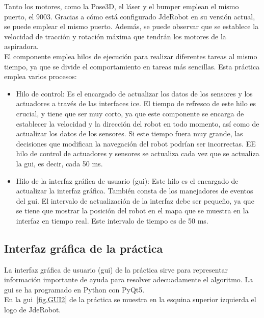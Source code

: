 Tanto los motores, como la Pose3D, el láser y el bumper emplean el mismo puerto, el 9003. Gracias a cómo está configurado JdeRobot en su versión actual, se puede emplear el mismo puerto. Además, se puede observar que se establece la velocidad de tracción y rotación máxima que tendrán los motores de la aspiradora.\\

El componente emplea hilos de ejecución para realizar diferentes tareas al mismo tiempo, ya que se divide el comportamiento en tareas más sencillas. Esta práctica emplea varios procesos:

\begin{itemize}
\item Hilo de control: Es el encargado de actualizar los datos de los sensores y los actuadores a través de las interfaces \acrshort{ice}. El tiempo de refresco de este hilo es crucial, y tiene que ser muy corto, ya que este componente se encarga de establecer la velocidad y la dirección del robot en todo momento, así como de actualizar los datos de los sensores. Si este tiempo fuera muy grande, las decisiones que modifican la navegación del robot podrían ser incorrectas. EE hilo de control de actuadores y sensores se actualiza cada vez que se actualiza la \acrshort{gui}, es decir, cada 50 ms.

\item	Hilo de la interfaz gráfica de usuario (\acrshort{gui}): Este hilo es el encargado de actualizar la interfaz gráfica. También consta de los manejadores de eventos del \acrshort{gui}. El intervalo de actualización de la interfaz debe ser pequeño, ya que se tiene que mostrar la posición del robot en el mapa que se muestra en la interfaz en tiempo real. Este intervalo de tiempo es de 50 ms.

\end{itemize}


\subsection{Interfaz gráfica de la práctica}
La interfaz gráfica de usuario (\acrshort{gui}) de la práctica sirve para representar información importante de ayuda para resolver adecuadamente el algoritmo. La \acrshort{gui} se ha programado en Python con PyQt5.\\

En la \acrshort{gui}~\ref{fig.GUI2} de la práctica se muestra en la esquina superior izquierda el logo de JdeRobot. \\

